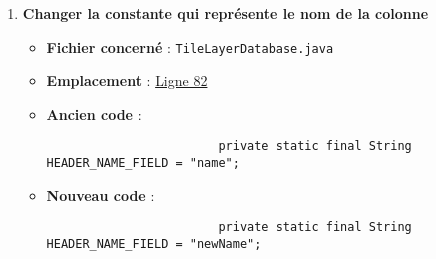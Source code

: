 \begin{enumerate}
    \item \textbf{Changer la constante qui représente le nom de la colonne}
          \begin{itemize}
              \item \textbf{Fichier concerné} : \texttt{TileLayerDatabase.java}
              \item \textbf{Emplacement} :
                    \href{https://github.com/MarcusWolschon/osmeditor4android/blob/dcabe8084aa15f5551a37c990516bf73398af1bf/src/main/java/de/blau/android/resources/TileLayerDatabase.java#L82}{Ligne 82}
              \item \textbf{Ancien code} :
                    \begin{verbatim}
                        private static final String HEADER_NAME_FIELD = "name";
                    \end{verbatim}
              \item \textbf{Nouveau code} :
                    \begin{verbatim}
                        private static final String HEADER_NAME_FIELD = "newName";
                    \end{verbatim}
          \end{itemize}


\end{enumerate}
